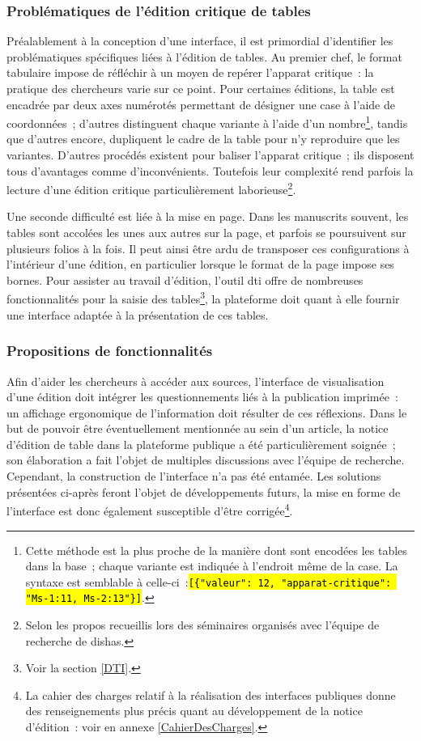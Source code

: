 \documentclass[a4paper,12pt,twoside]{book}
\let\OldTexttt\texttt
\renewcommand{\texttt}[1]{\OldTexttt{\hl{#1}}}
\newcommand{\dishas}{\gls{dishas}\xspace}
\newcommand{\dti}{\gls{dti}\xspace}
\begin{document}
			\subsubsection{Problématiques de l'édition critique de tables}
Préalablement à la conception d'une interface, il est primordial d'identifier les problématiques spécifiques liées à l'édition de tables. Au premier chef, le format tabulaire impose de réfléchir à un moyen de repérer l'apparat critique~: la pratique des chercheurs varie sur ce point. Pour certaines éditions, la table est encadrée par deux axes numérotés permettant de désigner une case à l'aide de coordonnées~; d'autres distinguent chaque variante à l'aide d'un nombre\footnote{Cette méthode est la plus proche de la manière dont sont encodées les tables dans la base~; chaque variante est indiquée à l'endroit même de la case. La syntaxe est semblable à celle-ci~:\newline\texttt{[\{"valeur": 12, "apparat-critique": "Ms-1:11, Ms-2:13"\}]}.}, tandis que d'autres encore, dupliquent le cadre de la table pour n'y reproduire que les variantes. D'autres procédés existent pour baliser l'apparat critique~; ils disposent tous d'avantages comme d'inconvénients. Toutefois leur complexité rend parfois la lecture d'une édition critique particulièrement laborieuse\footnote{Selon les propos recueillis lors des séminaires organisés avec l'équipe de recherche de \dishas.}.

Une seconde difficulté est liée à la mise en page. Dans les manuscrits souvent, les tables sont accolées les unes aux autres sur la page, et parfois se poursuivent sur plusieurs folios à la fois. Il peut ainsi être ardu de transposer ces configurations à l'intérieur d'une édition, en particulier lorsque le format de la page impose ses bornes. Pour assister au travail d'édition, l'outil \dti offre de nombreuses fonctionnalités pour la saisie des tables\footnote{Voir la section \ref{DTI}.}, la plateforme doit quant à elle fournir une interface adaptée à la présentation de ces tables.

			\subsubsection{Propositions de fonctionnalités}
Afin d'aider les chercheurs à accéder aux sources, l'interface de visualisation d'une édition doit intégrer les questionnements liés à la publication imprimée~: un affichage ergonomique de l'information doit résulter de ces réflexions. Dans le but de pouvoir être éventuellement mentionnée au sein d'un article, la notice d'édition de table dans la plateforme publique a été particulièrement soignée~; son élaboration a fait l'objet de multiples discussions avec l'équipe de recherche. Cependant, la construction de l'interface n'a pas été entamée. Les solutions présentées ci-après feront l'objet de développements futurs, la mise en forme de l'interface est donc également susceptible d'être corrigée\footnote{La cahier des charges relatif à la réalisation des interfaces publiques donne des renseignements plus précis quant au développement de la notice d'édition~: voir en annexe \ref{CahierDesCharges}.}.
\end{document}

